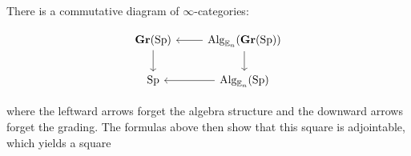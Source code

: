 There is a commutative diagram of $\infty$-categories:

$$
\begin{tikzcd}
\Gr(\Sp) \arrow[d]&  \Alg_{\E_n}(\Gr(\Sp))\arrow[l] \arrow[d]\\
\Sp & \Alg_{\E_n}(\Sp) \arrow[l] 
\end{tikzcd}
$$

where the leftward arrows forget the algebra structure and the downward arrows forget the grading.  The formulas above then show that this square is adjointable, which yields a square %








